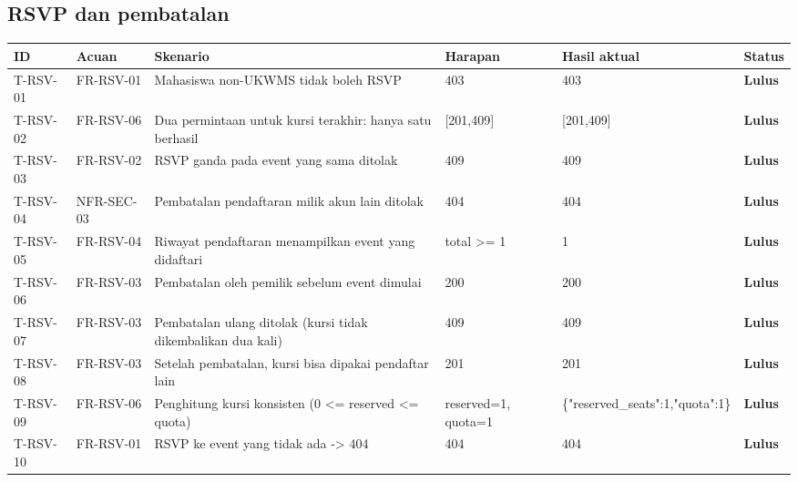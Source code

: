 \documentclass[11pt,a4paper]{article}
\renewcommand{\arraystretch}{1.2}
\begin{document}
\subsection{RSVP dan pembatalan}
{\footnotesize\setlength{\parskip}{0pt}\renewcommand{\arraystretch}{1.15}
\begin{longtable}{p{1.8cm}p{1.9cm}p{4.0cm}p{2.4cm}p{3.4cm}p{1.2cm}}
\toprule ID & Acuan & Skenario & Harapan & Hasil aktual & Status\\\midrule\endhead
\mbox{T-RSV-01} & FR-RSV-01 & Mahasiswa non-UKWMS tidak boleh RSVP & 403 & 403 & \textbf{Lulus}\\
\midrule
\mbox{T-RSV-02} & FR-RSV-06 & Dua permintaan untuk kursi terakhir: hanya satu berhasil & [201,409] & [201,409] & \textbf{Lulus}\\
\midrule
\mbox{T-RSV-03} & FR-RSV-02 & RSVP ganda pada event yang sama ditolak & 409 & 409 & \textbf{Lulus}\\
\midrule
\mbox{T-RSV-04} & NFR-SEC-03 & Pembatalan pendaftaran milik akun lain ditolak & 404 & 404 & \textbf{Lulus}\\
\midrule
\mbox{T-RSV-05} & FR-RSV-04 & Riwayat pendaftaran menampilkan event yang didaftari & total \textgreater{}= 1 & 1 & \textbf{Lulus}\\
\midrule
\mbox{T-RSV-06} & FR-RSV-03 & Pembatalan oleh pemilik sebelum event dimulai & 200 & 200 & \textbf{Lulus}\\
\midrule
\mbox{T-RSV-07} & FR-RSV-03 & Pembatalan ulang ditolak (kursi tidak dikembalikan dua kali) & 409 & 409 & \textbf{Lulus}\\
\midrule
\mbox{T-RSV-08} & FR-RSV-03 & Setelah pembatalan, kursi bisa dipakai pendaftar lain & 201 & 201 & \textbf{Lulus}\\
\midrule
\mbox{T-RSV-09} & FR-RSV-06 & Penghitung kursi konsisten (0 \textless{}= reserved \textless{}= quota) & reserved=1, quota=1 & \{"reserved\_seats":1,"quota":1\} & \textbf{Lulus}\\
\midrule
\mbox{T-RSV-10} & FR-RSV-01 & RSVP ke event yang tidak ada -\textgreater{} 404 & 404 & 404 & \textbf{Lulus}\\
\midrule
\bottomrule
\end{longtable}}
\end{document}
